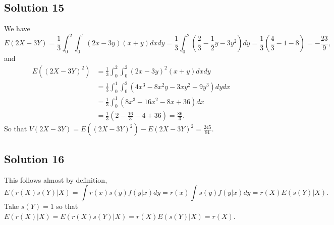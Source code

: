 \subsection*{Solution 15}

We have
\begin{equation*}
E(2X - 3Y) = \frac{1}{3} \int_0^2 \int_0^1 (2x - 3y)(x + y) dx dy
    = \frac{1}{3} \int_0^2 (\frac{2}{3} - \frac{1}{2}y - 3y^2) dy
    = \frac{1}{3} (\frac{4}{3} - 1 - 8)
    = - \frac{23}{9},
\end{equation*}
and
\begin{equation*}
\begin{split}
E((2X - 3Y)^2) &= \frac{1}{3} \int_0^2 \int_0^2 (2x - 3y)^2 (x + y) dx dy \\
    &= \frac{1}{3} \int_0^1 \int_0^2 (4x^3 - 8x^2y - 3xy^2 + 9y^3) dy dx \\
    &= \frac{1}{3} \int_0^1 (8x^3 - 16x^2 - 8x + 36) dx \\
    &= \frac{1}{3} (2 - \frac{16}{3} - 4 + 36)
    = \frac{86}{3}.
\end{split}
\end{equation*}
So that $V(2X - 3Y) = E((2X - 3Y)^2) - E(2X - 3Y)^2 = \frac{245}{81}$.


\subsection*{Solution 16}

This follows almost by definition,
\begin{equation*}
    E(r(X)s(Y)|X) = \int r(x)s(y) f(y|x) dy
        = r(x) \int s(y) f(y|x) dy
        = r(X) E(s(Y)|X).
\end{equation*}
Take $s(Y) = 1$ so that $E(r(X)|X) = E(r(X)s(Y)|X) = r(X) E(s(Y)|X) = r(X)$.
